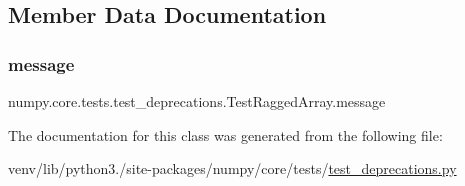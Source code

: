 \subsection{Member Data Documentation}
\mbox{\label{classnumpy_1_1core_1_1tests_1_1test__deprecations_1_1TestRaggedArray_a47ccc7fdb66a404c2fee16e0f4c8f5d7}} 
\subsubsection{\texorpdfstring{message}{message}}
{\footnotesize\ttfamily numpy.\+core.\+tests.\+test\+\_\+deprecations.\+Test\+Ragged\+Array.\+message\hspace{0.3cm}{\ttfamily [static]}}



The documentation for this class was generated from the following file\+:\begin{DoxyCompactItemize}
\item 
venv/lib/python3./site-\/packages/numpy/core/tests/\hyperlink{core_2tests_2test__deprecations_8py}{test\+\_\+deprecations.\+py}\end{DoxyCompactItemize}
